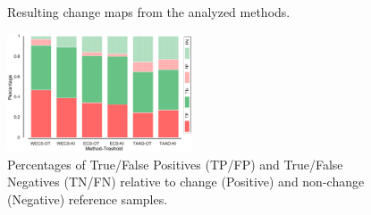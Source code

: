 \documentclass[journal]{IEEEtran}
\begin{document}
\begin{figure}[h!]
\centering

\mbox{
}

\mbox{
}

\caption{Resulting change maps from the analyzed methods.}\label{figSentinelResults}
\end{figure}




\begin{figure}[hbt]
\centering
\includegraphics[width=0.485\textwidth]{../../graphs/TPTNs.pdf}
\caption{Percentages of True/False Positives (TP/FP) and True/False Negatives (TN/FN) relative to change (Positive) and non-change (Negative) reference samples.}\label{figTPTNs}
\end{figure}
\end{document}
